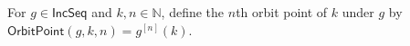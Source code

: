 \begin{definition}
For $g\in\mathsf{IncSeq}$ and $k,n\in\mathbb N$, define the $n$th orbit
point of $k$ under $g$ by
$\mathsf{OrbitPoint}(g,k,n)=g^{[n]}(k)$.
\end{definition}

